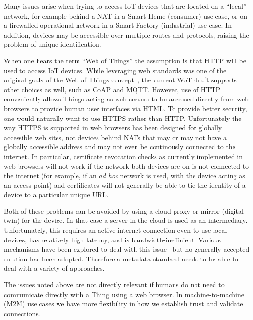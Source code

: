 Many issues arise when trying to access IoT devices
that are located on a ``local'' network,
for example behind a NAT in a Smart Home (consumer) use case,
or on a firewalled operational network in a Smart Factory
(industrial) use case.
In addition, devices may be accessible over multiple
routes and protocols, raising the problem of unique identification.

When one hears the term ``Web of Things'' the
assumption is that HTTP will be used to
access IoT devices. 
While leveraging web standards was one of the 
original goals of the Web of Things concept~\cite{Ostermaier2010},
the current WoT draft supports other choices as well,
such as CoAP and MQTT.
However, use of HTTP conveniently
allows Things acting as web servers to be accessed directly
from web browsers to provide human user interfaces via HTML.  
To provide better security, one would
naturally want to use HTTPS rather than HTTP.
Unfortunately the way HTTPS is supported in web browsers has
been designed for globally accessible web sites, not devices
behind NATs that may or may not have a globally accessible
address and may not even be continously connected to the internet.
In particular, certificate revocation checks as currently 
implemented in web browsers will not work if
the network both devices are on is not connected to the internet
(for example, if an \textit{ad hoc} network is used, with the device acting as
an access point) and certificates will not generally be able 
to tie the identity of a device to a particular unique URL. 

Both of these problems can be avoided by using a cloud proxy
or mirror (digital twin) for the device.
In that case a server
in the cloud is used as an intermediary.
Unfortunately,
this requires an active internet connection even to use 
local devices, has relatively high latency, and is
bandwidth-inefficient.
Various mechanisms have been explored to deal with this issue~\cite{httpslocal2017}
but no generally accepted solution has been adopted.
Therefore a metadata standard needs to be able to deal with a variety
of approaches.

The issues noted above are not directly relevant if humans do not need
to communicate directly with a Thing using a web browser.  
In machine-to-machine (M2M) use cases
we have more flexibility in how we establish trust and validate connections.


